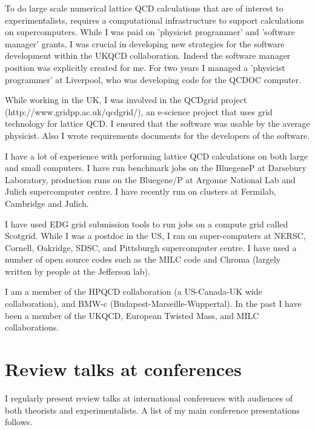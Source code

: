 \documentclass[12pt]{article}
\begin{document}
To do large scale numerical lattice QCD calculations that are of
interest to experimentalists, requires a computational infrastructure
to support calculations on supercomputers.  While I was paid on
'physicist programmer' and 'software manager' grants, I was crucial in
developing new strategies for the software development within the 
UKQCD collaboration.
Indeed the software manager position was explicitly created for me.
For two years I managed a 'physicist programmer' at Liverpool, who
was developing code for the QCDOC computer. 

While working in the UK, I was involved in the 
QCDgrid project (http://www.gridpp.ac.uk/qcdgrid/), 
an e-science project that
uses grid technology for lattice QCD.  I ensured that the software was
usable by the average physicist. Also I wrote requirements
documents for the developers of the software.

I have a lot of experience with performing lattice QCD calculations on
both large and small computers. 
I have run benchmark jobs on the 
BluegeneP at Darsebury Laboratory, production runs on
the Bluegene/P at Argonne National Lab and Julich supercomputer centre.
I have recently run on 
clusters at Fermilab, Cambridge and Julich.

I have
used EDG grid submission tools to run jobs on a compute grid
called Scotgrid.  While I was a postdoc in the US, I ran on
super-computers at NERSC, Cornell, Oakridge, SDSC, and Pittsburgh
supercomputer centre. I have used a number of open source codes such
as the MILC code and Chroma (largely written by people at the
Jefferson lab).

I am a member of the
HPQCD collaboration (a US-Canada-UK wide collaboration),
and BMW-c (Budapest-Marseille-Wuppertal).
In the past I have been a member of the UKQCD,
European Twisted Mass,
and MILC collaborations.

\section{Review talks at conferences}

I regularly present review talks at international
conferences with audiences of both theorists and experimentalists.
A list of my main conference presentations follows.
\end{document}
